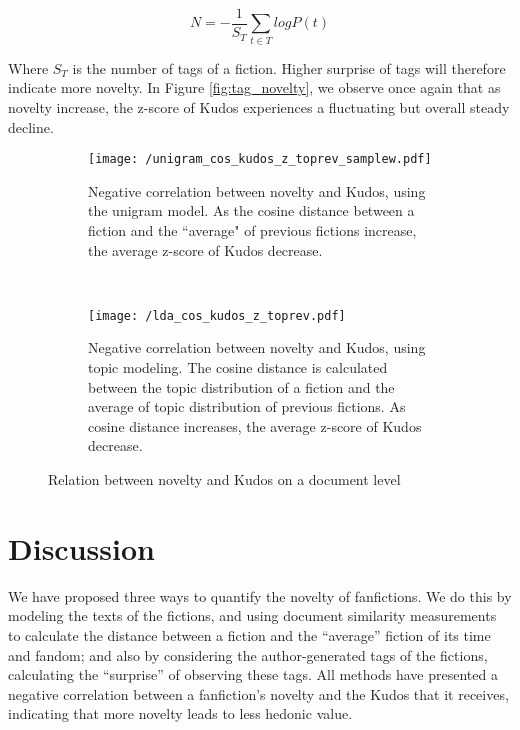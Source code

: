 \documentclass[a4paper]{article}
\begin{document}
\begin{equation}
N = -\frac{1}{S_T}\sum_{t \in{T}} logP(t)
\end{equation}

Where $S_T$ is the number of tags of a fiction. Higher surprise of tags will therefore indicate more novelty. In Figure \ref{fig:tag_novelty}, we observe once again that as novelty increase, the z-score of Kudos experiences a fluctuating but overall steady decline.


\begin{figure}
    \centering
    \begin{subfigure}[b]{0.7\textwidth}
        \texttt{[image: /unigram\_cos\_kudos\_z\_toprev\_samplew.pdf]}
        \caption{Negative correlation between novelty and Kudos, using the unigram model. As the cosine distance between a fiction and the ``average" of previous fictions increase, the average z-score of Kudos decrease.}
        \label{fig:unigram_cos}
    \end{subfigure}
    ~ %
    \begin{subfigure}[b]{0.7\textwidth}
        \texttt{[image: /lda\_cos\_kudos\_z\_toprev.pdf]}
        \caption{Negative correlation between novelty and Kudos, using topic modeling. The cosine distance is calculated between the topic distribution of a fiction and the average of topic distribution of previous fictions. As cosine distance increases, the average z-score of Kudos decrease.}
        \label{fig:lda_cos}
    \end{subfigure}
    \caption{Relation between novelty and Kudos on a document level}\label{fig:novelty_kudos_doc}
\end{figure}


\section*{Discussion}
We have proposed three ways to quantify the novelty of fanfictions. We do this by modeling the texts of the fictions, and using document similarity measurements to calculate the distance between a fiction and the ``average'' fiction of its time and fandom; and also by considering the author-generated tags of the fictions, calculating the ``surprise'' of observing these tags. All methods have presented a negative correlation between a fanfiction's novelty and the Kudos that it receives, indicating that more novelty leads to less hedonic value.
\end{document}
